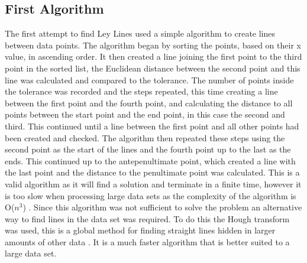 \documentclass[a4paper]{article}
\begin{document}
\subsection{First Algorithm}
The first attempt to find Ley Lines used a simple algorithm to create lines between data points. The algorithm began by sorting the points, based on their x value, in ascending order. It then created a line joining the first point to the third point in the sorted list, the Euclidean distance between the second point and this line was calculated and compared to the tolerance. The number of points inside the tolerance was recorded and the steps repeated, this time creating a line between the first point and the fourth point, and calculating the distance to all points between the start point and the end point, in this case the second and third. This continued until a line between the first point and all other points had been created and checked. 
\newline\newline
The algorithm then repeated these steps using the second point as the start of the lines and the fourth point up to the last as the ends. This continued up to the antepenultimate point, which created a line with the last point and the distance to the penultimate point was calculated. 
\newline\newline
This is a valid algorithm as it will find a solution and terminate in a finite time, however it is too slow when processing large data sets as the complexity of the algorithm is O($n^3$) . Since this algorithm was not sufficient to solve the problem an alternative way to find lines in the data set was required. To do this the Hough transform was used, this is a global method for finding straight lines hidden in larger amounts of other data \cite{Hough Transform}. It is a much faster algorithm that is better suited to a large data set. 
 
\end{document}
